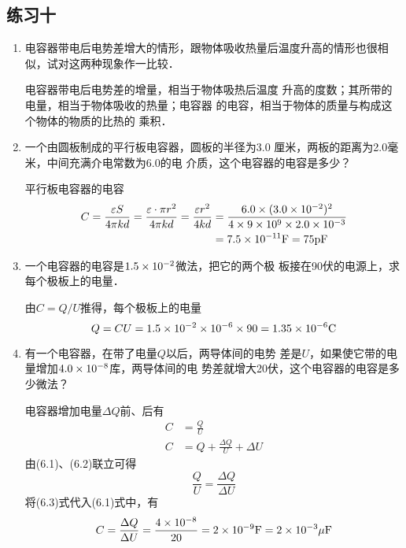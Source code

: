 \subsection{练习十}
\begin{enumerate}
	\item 电容器带电后电势差增大的情形，跟物体吸收热量后温度升高的情形也很相似，试对这两种现象作一比较．

    \begin{solution}
        电容器带电后电势差的增量，相当于物体吸热后温度
        升高的度数；其所带的电量，相当于物体吸收的热量；电容器
        的电容，相当于物体的质量与构成这个物体的物质的比热的
        乘积．
    \end{solution}
    
	\item 一个由圆板制成的平行板电容器，圆板的半径为3.0
厘米，两板的距离为2.0毫米，中间充满介电常数为6.0的电
介质，这个电容器的电容是多少？

\begin{solution}
    平行板电容器的电容
\[\begin{split}
    C=\dfrac{\varepsilon S}{4\pi kd}=\dfrac{\varepsilon\cdot  \pi r^2}{4\pi kd}=\frac{\varepsilon r^2}{4kd}
    &=\frac{6.0\times (3.0\times 10^{-2})^2}{4\times 9\times 10^9\times 2.0\times 10^{-3}}\\
    &=7.5\times 10^{-11}{\rm F}=75{\rm pF}
\end{split}\]
\end{solution}

\item 一个电容器的电容是$1.5\times10^{-2}$微法，把它的两个极
板接在90伏的电源上，求每个极板上的电量．

\begin{solution}
    由$C=Q/U$推得，每个极板上的电量
   \[ Q=CU=1.5\times10^{-2}\times10^{-6}\times90=1.35\times10^{-6}{\rm C}\]
\end{solution}

\item 有一个电容器，在带了电量$Q$以后，两导体间的电势
差是$U$，如果使它带的电量增加$4.0\times10^{-8}$库，两导体间的电
势差就增大20伏，这个电容器的电容是多少微法？

\begin{solution}
    电容器增加电量$\Delta Q$前、后有
    \begin{align}
    C&=\frac{Q}{U}\\
    C&=Q+\frac{\Delta Q}{U}+\Delta U    
    \end{align}
    由(6.1)、(6.2)联立可得
\begin{equation}
    \frac{Q}{U}=\frac{\Delta Q}{\Delta U}
\end{equation}
    将(6.3)式代入(6.1)式中，有
\[C=\frac{\Delta Q}{\Delta U}=\frac{4\times10^{-8}}{20}=2\times10^{-9}{\rm F}=2\times10^{-3}{\rm \mu F}\]



\end{solution}
\end{enumerate}
